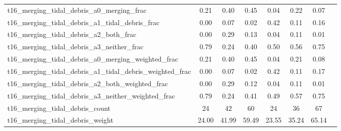 \begin{table*}
{\begin{tabular}{@{}lccccccc}
t16\_merging\_tidal\_debris\_a0\_merging\_frac & 0.21 & 0.40 & 0.45 & 0.04 & 0.22 & 0.07 &\\
t16\_merging\_tidal\_debris\_a1\_tidal\_debris\_frac & 0.00 & 0.07 & 0.02 & 0.42 & 0.11 & 0.16 &\\
t16\_merging\_tidal\_debris\_a2\_both\_frac & 0.00 & 0.29 & 0.13 & 0.04 & 0.11 & 0.01 &\\
t16\_merging\_tidal\_debris\_a3\_neither\_frac & 0.79 & 0.24 & 0.40 & 0.50 & 0.56 & 0.75 &\\
t16\_merging\_tidal\_debris\_a0\_merging\_weighted\_frac & 0.21 & 0.40 & 0.45 & 0.04 & 0.21 & 0.08 &\\
t16\_merging\_tidal\_debris\_a1\_tidal\_debris\_weighted\_frac & 0.00 & 0.07 & 0.02 & 0.42 & 0.11 & 0.17 &\\
t16\_merging\_tidal\_debris\_a2\_both\_weighted\_frac & 0.00 & 0.29 & 0.12 & 0.04 & 0.11 & 0.01 &\\
t16\_merging\_tidal\_debris\_a3\_neither\_weighted\_frac & 0.79 & 0.24 & 0.41 & 0.49 & 0.57 & 0.75 &\\
t16\_merging\_tidal\_debris\_count & 24 & 42 & 60 & 24 & 36 & 67 &\\
t16\_merging\_tidal\_debris\_weight & 24.00 & 41.99 & 59.49 & 23.55 & 35.24 & 65.14 &\\
\hline
\end{tabular}}
\contcaption{}
\end{table*}